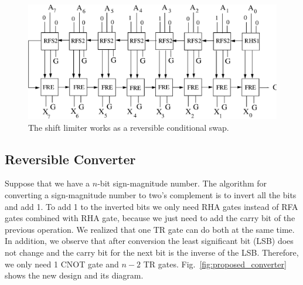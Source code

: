 \documentclass[%
reprint,
 amsmath,amssymb,
 aps,
]{revtex4-1}
\begin{document}
\begin{figure}[h]
\centering
\includegraphics[width=1\textwidth]{checker.eps}
\caption{The shift limiter works as a reversible conditional swap.}
\label{fig:shift_limiter}
\end{figure}

\subsection{Reversible Converter}

Suppose that we have a $n$-bit sign-magnitude number. The algorithm for converting a sign-magnitude number to two's complement is to invert all the bits and add 1. To add 1 to the inverted bits we only need RHA gates instead of RFA gates combined with RHA gate, because we just need to add the carry bit of the previous operation. We realized that one TR gate can do both at the same time. In addition, we observe that after conversion the least significant bit (LSB) does not change and the carry bit for the next bit is the inverse of the LSB. Therefore, we only need 1 CNOT gate and $n-2$ TR gates.  Fig.~\ref{fig:proposed_converter} shows the new design and its diagram.
\end{document}

